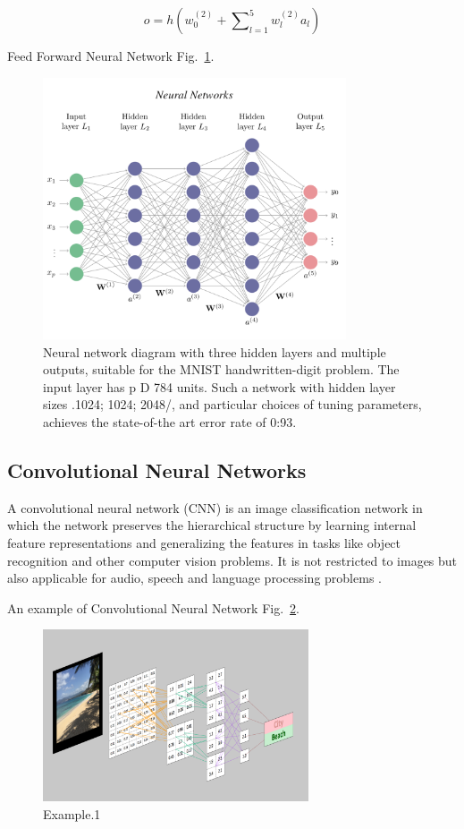 \begin{equation}
 o=h\left( w^{( 2)}_{0} +\sum\nolimits ^{5}_{l=1} w^{( 2)}_{l} a_{l}\right)
 \label{single output units}
\end{equation}

Feed Forward Neural Network Fig.~\ref{fig:multi-layer}.
\begin{figure}[htbp]
\centering
\includegraphics[width=0.8\textwidth]{images/NN.png}
\caption{Neural network diagram with three hidden layers and multiple outputs, suitable for the MNIST handwritten-digit problem. The input layer has p D 784 units. Such a network with hidden layer sizes .1024; 1024; 2048/, and particular choices of tuning parameters, achieves the state-of-the art error rate of 0:93.}
\label{fig:multi-layer}
\end{figure}

\clearpage

\subsection{Convolutional Neural Networks}
A convolutional neural network (CNN) is an image classification network in which the network preserves the hierarchical structure by learning internal feature representations and generalizing the features in tasks like object recognition and other computer vision problems. It is not restricted to images but also applicable for audio, speech and language processing problems \cite{Manaswi2018}.

An example of Convolutional Neural Network Fig.~\ref{fig:CNN-1}.
\begin{figure}[htbp]
\centering
\includegraphics[width=0.7\textwidth]{images/CNN.png}
\caption{Example.1}
\label{fig:CNN-1}
\end{figure}

